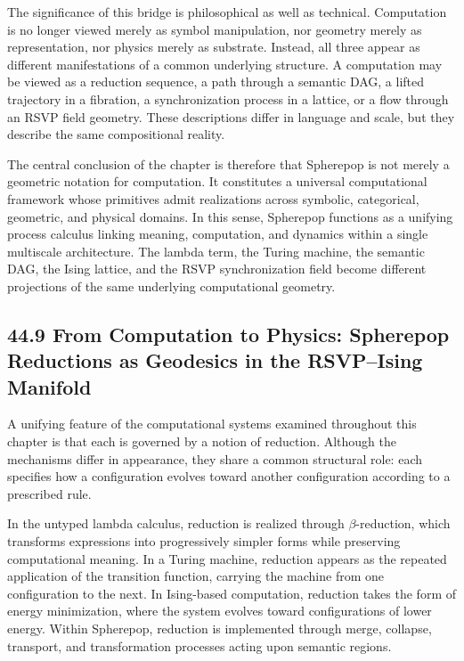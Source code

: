 \documentclass[12pt,letterpaper]{article}
\theoremstyle{remark}
\begin{document}
The significance of this bridge is philosophical as well as technical. Computation is no longer viewed merely as symbol manipulation, nor geometry merely as representation, nor physics merely as substrate. Instead, all three appear as different manifestations of a common underlying structure. A computation may be viewed as a reduction sequence, a path through a semantic DAG, a lifted trajectory in a fibration, a synchronization process in a lattice, or a flow through an RSVP field geometry. These descriptions differ in language and scale, but they describe the same compositional reality.

The central conclusion of the chapter is therefore that Spherepop is not merely a geometric notation for computation. It constitutes a universal computational framework whose primitives admit realizations across symbolic, categorical, geometric, and physical domains. In this sense, Spherepop functions as a unifying process calculus linking meaning, computation, and dynamics within a single multiscale architecture. The lambda term, the Turing machine, the semantic DAG, the Ising lattice, and the RSVP synchronization field become different projections of the same underlying computational geometry.

\subsection{44.9 From Computation to Physics:
Spherepop Reductions as Geodesics in the RSVP--Ising Manifold}

A unifying feature of the computational systems examined throughout this chapter is that each is governed by a notion of reduction. Although the mechanisms differ in appearance, they share a common structural role: each specifies how a configuration evolves toward another configuration according to a prescribed rule.

In the untyped lambda calculus, reduction is realized through $\beta$-reduction, which transforms expressions into progressively simpler forms while preserving computational meaning. In a Turing machine, reduction appears as the repeated application of the transition function, carrying the machine from one configuration to the next. In Ising-based computation, reduction takes the form of energy minimization, where the system evolves toward configurations of lower energy. Within Spherepop, reduction is implemented through merge, collapse, transport, and transformation processes acting upon semantic regions.
\end{document}
